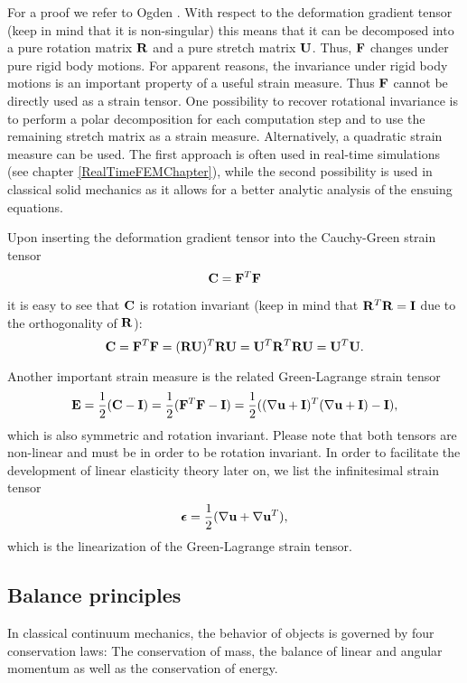 For a proof we refer to Ogden \cite{Ogden1997}. With respect to the deformation gradient tensor (keep in mind that it is non-singular) this means that it can be decomposed into a pure rotation matrix $\mathbf{R}$ and a pure stretch matrix $\mathbf {U} $. Thus, $\mathbf {F }$ changes under pure rigid body motions. For apparent reasons, the invariance under rigid body motions is an important property of a useful strain measure. Thus $\mathbf {F }$ cannot be directly used as a strain tensor. One possibility to recover rotational invariance is to perform a polar decomposition for each computation step and to use the remaining stretch matrix as a strain measure. Alternatively, a quadratic strain measure can be used. The first approach is often used in real-time simulations (see chapter \ref{RealTimeFEMChapter}), while the second possibility is used in classical solid mechanics as it allows for a better analytic analysis of the ensuing equations. 

Upon inserting the deformation gradient tensor into the Cauchy-Green strain tensor 
 \begin{equation}
\mathbf {C}  = \mathbf {F } ^T \mathbf {F }
\label{CauchyGreenTensor}
\end{equation}

it is easy to see that $\mathbf {C} $ is rotation invariant (keep in mind that $\mathbf{R}^T \mathbf{R} = \mathbf I$ due to the orthogonality of $\mathbf{R}$):
 \begin{equation}
\mathbf {C}  = \mathbf {F } ^T \mathbf {F } = (\mathbf{R} \mathbf {U} )^T \mathbf{R} \mathbf {U}  =  \mathbf {U}  ^T \mathbf{R} ^T \mathbf{R} \mathbf {U}  = \mathbf {U}  ^T  \mathbf {U} .
\end{equation}

Another important strain measure is the related Green-Lagrange strain tensor
 \begin{equation}
\mathbf {E}  = \frac{1}{2} ( \mathbf {C}  -  \mathbf {I } ) =  \frac{1}{2} ( \mathbf {F } ^T \mathbf {F } -  \mathbf {I } )  = \frac{1}{2} ( (\nabla \mathbf {u}  +  \mathbf {I } )^T (\nabla \mathbf {u}  +  \mathbf {I } ) -  \mathbf {I } ),
\label{GreenLagrangeTensor}
\end{equation}
which is also symmetric and rotation invariant. Please note that both tensors are non-linear and must be in order to be rotation invariant. In order to facilitate the development of linear elasticity theory later on, we list the infinitesimal strain tensor 
 \begin{equation}
\boldsymbol \epsilon  =  \frac{1}{2} ( \nabla \mathbf {u}  +  \nabla \mathbf {u}  ^T ),
\label{InfinitesimalStrainTensor}
\end{equation}
which is the linearization of the Green-Lagrange strain tensor.

\subsection{Balance principles}
In classical continuum mechanics, the behavior of objects is governed by four conservation laws: The conservation of mass, the balance of linear and angular momentum as well as the conservation of energy. 

